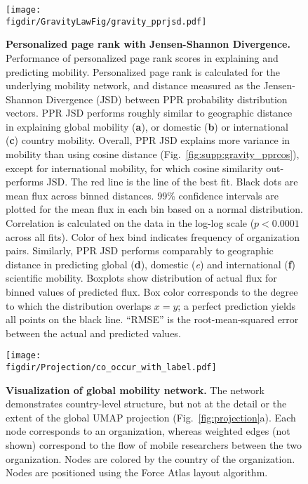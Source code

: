 \documentclass[12pt]{article} %
\def\figdir{../Figs}
\begin{document}
\begin{figure}[p!]
	\centering
	\texttt{[image: \\figdir/GravityLawFig/gravity\_pprjsd.pdf]}
	\caption{
		\textbf{Personalized page rank with Jensen-Shannon Divergence.}
		Performance of personalized page rank scores in explaining and predicting mobility.
		Personalized page rank is calculated for the underlying mobility network, and distance measured as the Jensen-Shannon Divergence (JSD) between PPR probability distribution vectors.
		PPR JSD performs roughly similar to geographic distance in explaining global mobility (\textbf{a}), or domestic (\textbf{b}) or international (\textbf{c}) country mobility.
		Overall, PPR JSD explains more variance in mobility than using cosine distance (Fig.~\ref{fig:supp:gravity_pprcos}), except for international mobility, for which cosine similarity out-performs JSD.
		The red line is the line of the best fit.
		Black dots are mean flux across binned distances.
		99\% confidence intervals are plotted for the mean flux in each bin based on a normal distribution. 
		Correlation is calculated on the data in the log-log scale ($p < 0.0001$ across all fits).
		Color of hex bind indicates frequency of organization pairs.
		Similarly, PPR JSD performs comparably to geographic distance in predicting global (\textbf{d}), domestic (\textit{e}) and international (\textbf{f}) scientific mobility.
		Boxplots show distribution of actual flux for binned values of predicted flux.
		Box color corresponds to the degree to which the distribution overlaps $x = y$;
		a perfect prediction yields all points on the black line. 
		``RMSE'' is the root-mean-squared error between the actual and predicted values.
	}
	\label{fig:supp:gravity_pprjsd}
\end{figure}


%
%
\begin{figure}[hp!]
	\centering
	\texttt{[image: \\figdir/Projection/co\_occur\_with\_label.pdf]}
	\caption{
		\textbf{Visualization of global mobility network.}
		The network demonstrates country-level structure, but not at the detail or the extent of the global UMAP projection (Fig.~\ref{fig:projection}a).
		Each node corresponds to an organization, whereas  weighted edges (not shown) correspond to the flow of mobile researchers between the two organization.
		Nodes are colored by the country of the organization.
		Nodes are positioned using the Force Atlas layout algorithm.
	}
	\label{fig:supp:network_vis}
\end{figure}
\end{document}
